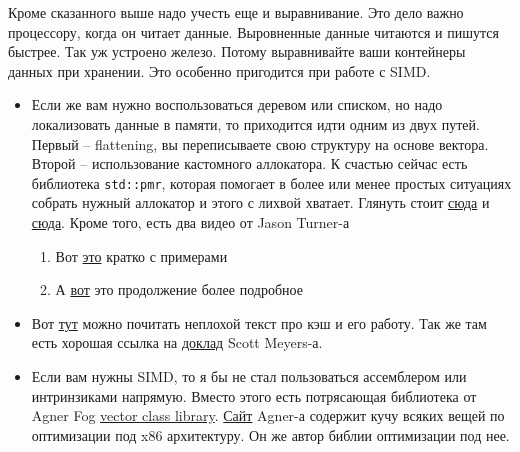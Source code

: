 \documentclass{article}
\begin{document}
Кроме сказанного выше надо учесть еще и выравнивание. Это дело важно процессору, когда он читает данные. Выровненные данные читаются и пишутся быстрее. Так уж устроено железо. Потому выравнивайте ваши контейнеры данных при хранении. Это особенно пригодится при работе с SIMD.

\begin{itemize}
\item Если же вам нужно воспользоваться деревом или списком, но надо локализовать данные в памяти, то приходится идти одним из двух путей. Первый --  flattening, вы переписываете свою структуру на основе вектора. Второй -- использование кастомного аллокатора. К счастью сейчас есть библиотека \verb"std::pmr", которая помогает в более или менее простых ситуациях собрать нужный аллокатор и этого с лихвой хватает. Глянуть стоит \href{https://en.cppreference.com/w/cpp/memory/polymorphic_allocator}{сюда} и \href{https://en.cppreference.com/w/cpp/memory/memory_resource}{сюда}. Кроме того, есть два видео от Jason Turner-а
\begin{enumerate}
\item Вот \href{https://youtu.be/q6A7cKFXjY0}{это} кратко с примерами 
\item А \href{https://youtu.be/vXJ1dwJ9QkI}{вот} это продолжение более подробное 
\end{enumerate}


\item Вот \href{https://medium.com/software-design/why-software-developers-should-care-about-cpu-caches-8da04355bb8a}{тут} можно почитать неплохой текст про кэш и его работу. Так же там есть хорошая ссылка на \href{https://www.youtube.com/watch?v=WDIkqP4JbkE}{доклад} Scott Meyers-а.

\item Если вам нужны SIMD, то я бы не стал пользоваться ассемблером или интринзиками напрямую. Вместо этого есть потрясающая библиотека от Agner Fog \href{https://github.com/vectorclass/version2}{vector class library}. \href{https://www.agner.org/}{Сайт} Agner-а содержит кучу всяких вещей по оптимизации под x86 архитектуру. Он же автор библии оптимизации под нее.


\end{itemize}
\end{document}
